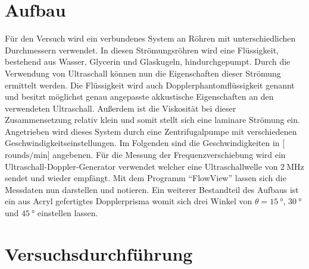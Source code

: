 \section{Aufbau}

Für den Versuch wird ein verbundenes System an Röhren mit unterschiedlichen Durchmessern verwendet. In diesen Strömungsröhren wird eine Flüssigkeit, bestehend aus Wasser, Glycerin und Glaskugeln, hindurchgepumpt. Durch die Verwendung von Ultraschall
können nun die Eigenschaften dieser Strömung ermittelt werden.
Die Flüssigkeit wird auch Dopplerphantomflüssigkeit genannt und besitzt möglichst genau angepasste akkustische Eigenschaften an den verwendeten Ultraschall. Außerdem ist die Viskosität bei dieser Zusammensetzung relativ klein und somit
stellt sich eine laminare Strömung ein. 
Angetrieben wird dieses System durch eine Zentrifugalpumpe mit verschiedenen Geschwindigkeitseinstellungen. Im Folgenden sind die Geschwindigkeiten in [$\si{{\text{rounds}}\per\minute}$] angebenen.
Für die Messung der Frequenzverschiebung wird ein Ultraschall-Doppler-Generator verwendet welcher eine Ultraschallwelle von $\SI{2}{\mega\hertz}$ sendet und wieder empfängt. 
Mit dem Programm \enquote{FlowView} lassen sich die Messdaten nun darstellen und notieren.
Ein weiterer Bestandteil des Aufbaus ist ein aus Acryl gefertigtes Dopplerprisma womit sich drei Winkel von $\theta = \SI{15}{\degree}$, $\SI{30}{\degree}$ und $\SI{45}{\degree} $ einstellen lassen. 

\section{Versuchsdurchführung}

